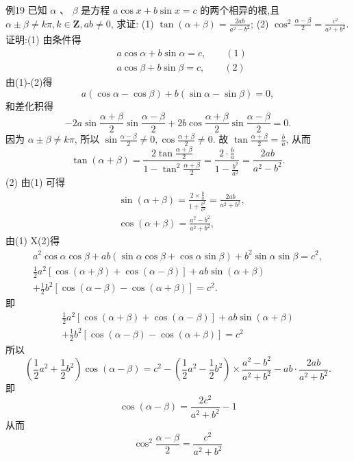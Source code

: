 例19 已知 $\alpha$ 、 $\beta$ 是方程 $a \cos x+b \sin x=c$ 的两个相异的根,且 $\alpha \pm \beta \neq k \pi, k \in \mathbf{Z}, a b \neq 0$, 求证: (1) $\tan (\alpha+\beta)=\frac{2 a b}{a^2-b^2}$; (2) $\cos ^2 \frac{\alpha-\beta}{2}=\frac{c^2}{a^2+b^2}$.
证明:(1) 由条件得
$$
\begin{aligned}
& a \cos \alpha+b \sin \alpha=c, \quad\quad (1)\\
& a \cos \beta+b \sin \beta=c, \quad\quad (2)
\end{aligned}
$$
由(1)-(2)得
$$
a(\cos \alpha-\cos \beta)+b(\sin \alpha-\sin \beta)=0,
$$
和差化积得
$$
-2 a \sin \frac{\alpha+\beta}{2} \sin \frac{\alpha-\beta}{2}+2 b \cos \frac{\alpha+\beta}{2} \sin \frac{\alpha-\beta}{2}=0 .
$$
因为 $\alpha \pm \beta \neq k \pi$, 所以 $\sin \frac{\alpha-\beta}{2} \neq 0, \cos \frac{\alpha+\beta}{2} \neq 0$. 故 $\tan \frac{\alpha+\beta}{2}=\frac{b}{a}$,
从而
$$
\tan (\alpha+\beta)=\frac{2 \tan \frac{\alpha+\beta}{2}}{1-\tan ^2 \frac{\alpha+\beta}{2}}=\frac{2 \cdot \frac{b}{a}}{1-\frac{b^2}{a^2}}=\frac{2 a b}{a^2-b^2} .
$$
(2) 由(1) 可得
$$
\begin{aligned}
& \sin (\alpha+\beta)=\frac{2 \times \frac{b}{a}}{1+\frac{b^2}{a^2}}=\frac{2 a b}{a^2+b^2}, \\
& \cos (\alpha+\beta)=\frac{a^2-b^2}{a^2+b^2},
\end{aligned}
$$
由(1) X(2)得
$$
\begin{gathered}
a^2 \cos \alpha \cos \beta+a b(\sin \alpha \cos \beta+\cos \alpha \sin \beta)+b^2 \sin \alpha \sin \beta=c^2, \\
\frac{1}{2} a^2[\cos (\alpha+\beta)+\cos (\alpha-\beta)]+a b \sin (\alpha+\beta) \\
+\frac{1}{2} b^2[\cos (\alpha-\beta)-\cos (\alpha+\beta)]=c^2 .
\end{gathered}
$$
即
$$
\begin{gathered}
\frac{1}{2} a^2[\cos (\alpha+\beta)+\cos (\alpha-\beta)]+a b \sin (\alpha+\beta) \\
+\frac{1}{2} b^2[\cos (\alpha-\beta)-\cos (\alpha+\beta)]=c^2
\end{gathered}
$$
所以
$$
\left(\frac{1}{2} a^2+\frac{1}{2} b^2\right) \cos (\alpha-\beta)=c^2-\left(\frac{1}{2} a^2-\frac{1}{2} b^2\right) \times \frac{a^2-b^2}{a^2+b^2}-a b \cdot \frac{2 a b}{a^2+b^2} .
$$
即
$$
\cos (\alpha-\beta)=\frac{2 c^2}{a^2+b^2}-1
$$
从而
$$
\cos ^2 \frac{\alpha-\beta}{2}=\frac{c^2}{a^2+b^2}
$$



